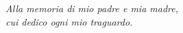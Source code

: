 \begin{titlepage}
  \thispagestyle{empty}

  \topmargin=6.5cm %

  \begin{flushright}
    \large
    \em 
    Alla memoria di mio padre e mia madre,\\ 
    cui dedico ogni mio traguardo.
  \end{flushright}
\end{titlepage}
